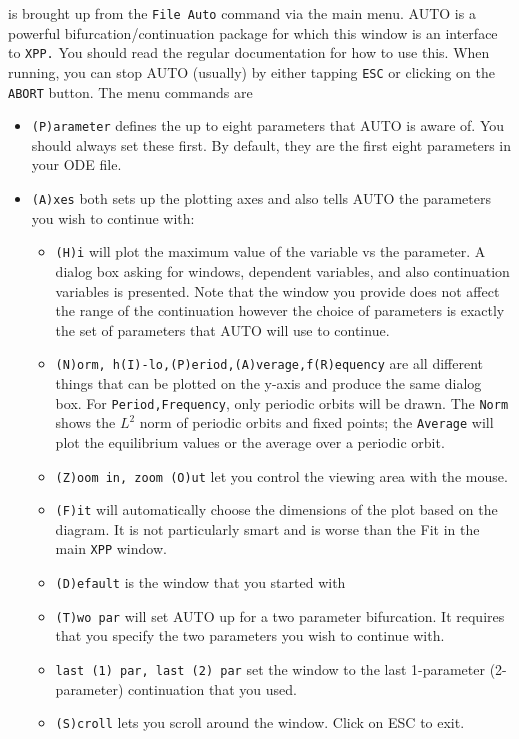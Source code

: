\documentclass{article}
\begin{document}
\bigskip
{} is brought up from the {\tt File Auto} command via the main menu. AUTO is a powerful bifurcation/continuation package for which this window is an interface to {\tt XPP.} You should read the regular documentation for how to use this. When running, you can stop AUTO (usually) by either tapping {\tt ESC} or clicking on the {\tt ABORT} button.
The menu commands are
\begin{itemize}
\item {\tt (P)arameter} defines the up to eight parameters that AUTO is aware of. You should always set these first. By default, they are the first eight parameters in your ODE file.  
\item {\tt (A)xes} both sets up the plotting axes and also tells AUTO the parameters you wish to continue with:
\begin{itemize}
\item {\tt (H)i} will plot the maximum value of the variable vs the parameter. A dialog box asking for windows, dependent variables, and also continuation variables is presented. Note that the window you provide does not affect the range of the continuation however the choice of parameters is exactly the set of parameters that AUTO will use to continue. 
\item {\tt (N)orm, h(I)-lo,(P)eriod,(A)verage,f(R)equency} are all different things that can be plotted on the y-axis and produce the same dialog box. For {\tt Period,Frequency}, only periodic orbits will be drawn. The {\tt Norm} shows the $L^2$ norm of periodic orbits and fixed points; the {\tt Average} will plot the equilibrium values or the average over a periodic orbit.  
\item {\tt (Z)oom in, zoom (O)ut} let you control the viewing area with the mouse. 
\item {\tt (F)it} will automatically choose the dimensions of the plot based on the diagram. It is not particularly smart and is worse than the Fit in the main {\tt XPP} window. 
\item {\tt (D)efault} is the window that you started with
\item {\tt (T)wo par} will set AUTO up for a two parameter bifurcation. It requires that you specify the two parameters you wish to continue with. 
\item {\tt last (1) par, last (2) par} set the window to the last 1-parameter (2-parameter) continuation that you used.
\item {\tt (S)croll} lets you scroll around the window. Click on ESC to exit. 

\end{itemize}
\end{itemize}
\end{document}

